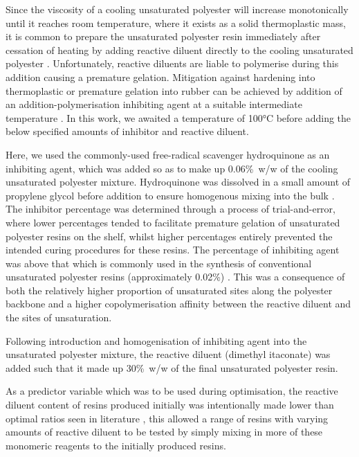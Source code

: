 Since the viscosity of a cooling unsaturated polyester will increase 
 monotonically until it reaches room temperature, where it exists as a
 solid thermoplastic mass, it is common to prepare the unsaturated
 polyester resin immediately after cessation of heating by adding
 reactive diluent directly to the cooling unsaturated polyester
 \autocite{Parkyn1967}.
Unfortunately, reactive diluents are liable to
 polymerise during this addition causing a premature gelation.
Mitigation against hardening into thermoplastic or
 premature gelation into rubber can be achieved by addition of an 
 addition-polymerisation inhibiting agent at a suitable intermediate
 temperature \autocite{Parkyn1967,Ahamad2001,Cherian2004}.
In this work, we awaited a temperature of 100\unit{\degreeCelsius} before 
 adding the below specified amounts of inhibitor and reactive diluent.

Here, we used the commonly-used free-radical scavenger hydroquinone
 as an inhibiting agent, which was added so as to make up
 0.06\unit{\percent}~w/w of the cooling unsaturated polyester mixture.
Hydroquinone was dissolved in a small amount of propylene glycol before
 addition to ensure homogenous mixing into the bulk
 \autocite{Parkyn1967}.
The inhibitor percentage was determined through a process of
 trial-and-error, where lower percentages tended to facilitate premature
 gelation of unsaturated polyester resins on the shelf, whilst higher
 percentages entirely prevented the intended curing procedures for these 
 resins.
The percentage of inhibiting agent was above that which is
 commonly used in the synthesis of conventional unsaturated polyester
 resins (approximately 0.02\unit{\percent}) \autocite{Parkyn1967,Cherian2004}.
This was a consequence of both the relatively higher proportion of
 unsaturated sites along the polyester backbone and a higher copolymerisation
 affinity between the reactive diluent and the sites of unsaturation.

Following introduction and homogenisation of inhibiting agent into
 the unsaturated polyester mixture, the reactive diluent (dimethyl itaconate)
 was added such that it made up 30\unit{\percent}~w/w of the final
 unsaturated polyester resin.

As a predictor variable which was to be used during optimisation, the 
 reactive diluent content of resins produced initially was intentionally 
 made lower than optimal ratios seen in literature
 \autocite{Parkyn1967,Ahamad2001,Cherian2004,Bodnar1990}, this allowed a
 range of resins with varying amounts of reactive diluent to be tested by 
 simply mixing in more of these monomeric reagents to the initially produced
 resins.

